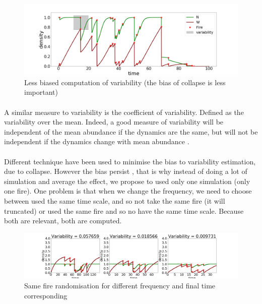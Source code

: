 \documentclass{article}
\begin{document}
\begin{figure}[h!]
\centering
\includegraphics[width=12.cm]{time_series_sd_2.png}
\caption{Less biased computation of variability (the bias of collapse is less important)}
\end{figure}


\paragraph{}
A similar measure to variability is the coefficient of variability. Defined as the variability over the mean. Indeed, a good measure of variability will be independent of the mean abundance if the dynamics are the same, but will not be independent if the dynamics change with mean abundance \citep{gaston_measurement_1993, noauthor_temporal_1994}.







\paragraph{}
Different technique have been used to minimise the bias to variability estimation, due to collapse. However the bias persist \citep{seely2004complex}, that is why instead of doing a lot of simulation and average the effect, we propose to used only one simulation (only one fire). One problem is that when we change the frequency, we need to choose between used the same time scale, and so not take the same fire (it will truncated) or used the same fire and so no have the same time scale. Because both are relevant, both are computed. 





\begin{figure}[h!]
\centering
\includegraphics[width=12.cm]{same_2.png}
\caption{Same fire randomisation for different frequency and final time corresponding}
\end{figure}
\end{document}
